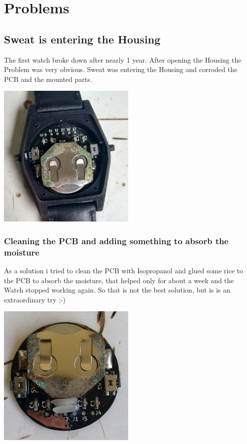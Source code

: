 \section{Problems}
\subsection{Sweat is entering the Housing}
The first watch broke down after nearly 1 year. After opening the Housing the Problem was very obvious. Sweat was entering the Housing and corroded the PCB and the mounted parts.
\begin{center}
  \includegraphics[width=0.5\textwidth]{../Pictures/ProbCorr1.jpg}
\end{center}
\subsubsection{Cleaning the PCB and adding something to absorb the moisture}
As a solution i tried to clean the PCB with Isopropanol and glued some rice to the PCB to absorb the moisture, that helped only for about a week and the Watch stopped working again. So that is not the best solution, but is is an extraordinary try ;-)
\begin{center}
  \includegraphics[width=0.5\textwidth]{../Pictures/ProbCorrSol1.jpg}
\end{center}
